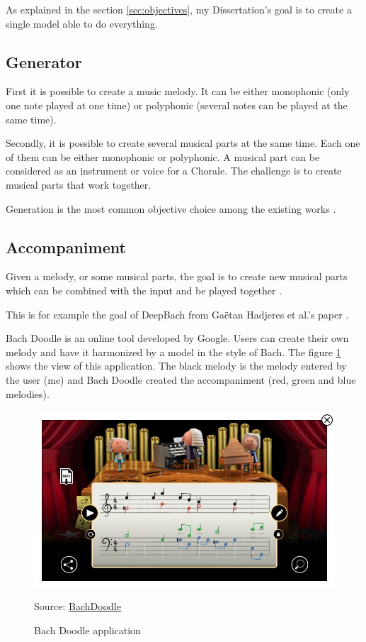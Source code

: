 \documentclass[12pt]{report}
\begin{document}
As explained in the section \ref{sec:objectives}, my Dissertation's goal is to create a single model able to do everything.

\subsection{Generator}

First it is possible to create a music melody. It can be either monophonic (only one note played at one time) or polyphonic (several notes can be played at the same time).

Secondly, it is possible to create several musical parts at the same time. Each one of them can be either monophonic or polyphonic.
A musical part can be considered as an instrument or voice for a Chorale.
The challenge is to create musical parts that work together.

Generation is the most common objective choice among the existing works \cite{liang_automatic_2017, chuan_modeling_nodate, huang_counterpoint_2017, boulanger-lewandowski_modeling_2012, lattner_imposing_2018}.

\subsection{Accompaniment}

Given a melody, or some musical parts, the goal is to create new musical parts which can be combined with the input and be played together \cite{hadjeres_deepbach:_2016, huang_bach_2019}.

This is for example the goal of DeepBach from Gaëtan Hadjeres et al.'s paper \cite{hadjeres_deepbach:_2016}.

Bach Doodle \cite{huang_bach_2019} is an online tool developed by Google.
Users can create their own melody and have it harmonized by a model in the style of Bach.
The figure \ref{fig:bachdoodle} shows the view of this application.
The black melody is the melody entered by the user (me) and Bach Doodle created the accompaniment (red, green and blue melodies).

\begin{figure}[htbp]
    \centering
    \includegraphics[width=\textwidth]{images/related_works/bachdooldle/bachdoodle.jpg}
    \caption{Bach Doodle application}
    Source: \href{https://www.google.com/doodles/celebrating-johann-sebastian-bach}{BachDoodle}
    \label{fig:bachdoodle}
\end{figure}
\end{document}

